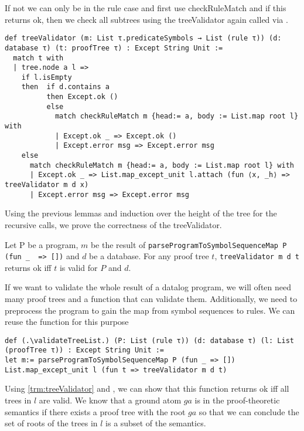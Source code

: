 If not we can only be in the rule case and first use checkRuleMatch and if this returns ok, then we check all subtrees using the treeValidator again called via \Listmapexceptunit.

\begin{lstlisting}
def treeValidator (m: List τ.predicateSymbols → List (rule τ)) (d: database τ) (t: proofTree τ) : Except String Unit :=
  match t with
  | tree.node a l =>
    if l.isEmpty
    then  if d.contains a
          then Except.ok ()
          else
            match checkRuleMatch m {head:= a, body := List.map root l} with
            | Except.ok _ => Except.ok ()
            | Except.error msg => Except.error msg
    else
      match checkRuleMatch m {head:= a, body := List.map root l} with
      | Except.ok _ => List.map_except_unit l.attach (fun ⟨x, _h⟩ => treeValidator m d x)
      | Except.error msg => Except.error msg
\end{lstlisting}

Using the previous lemmas and induction over the height of the tree for the recursive calls, we prove the correctness of the treeValidator.

\begin{theorem}[\treeValidatorOkIffIsValid]\label{trm:treeValidator}
    Let P be a program, $m$ be the result of \lstinline|parseProgramToSymbolSequenceMap P (fun _  => [])| and $d$ be a database. For any proof tree $t$, \lstinline|treeValidator m d t| returns ok iff $t$ is valid for $P$ and $d$.
\end{theorem}


If we want to validate the whole result of a datalog program, we will often need many proof trees and a function that can validate them. Additionally, we need to preprocess the program to gain the map from symbol sequences to rules. We can reuse the \Listmapexceptunit function for this purpose

\begin{lstlisting}
def (.\validateTreeList.) (P: List (rule τ)) (d: database τ) (l: List (proofTree τ)) : Except String Unit :=
let m:= parseProgramToSymbolSequenceMap P (fun _ => [])
List.map_except_unit l (fun t => treeValidator m d t)
\end{lstlisting}

Using \cref{trm:treeValidator} and \ListmapexceptunitIsUnitIffAll, we can show that this function returns ok iff all trees in $l$ are valid. We know that a ground atom $ga$ is in the proof-theoretic semantics if there exists a proof tree with the root $ga$ so that we can conclude the set of roots of the trees in $l$ is a subset of the semantics. 


